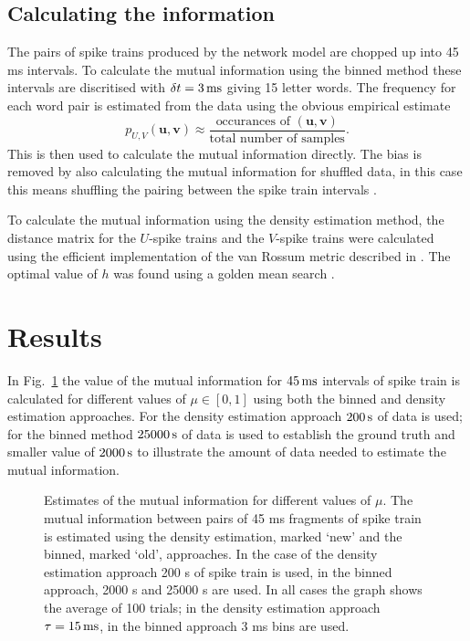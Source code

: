 \documentclass[12pt]{article}
\newcommand{\ms}{\mbox{\,ms}}
\newcommand{\s}{\mbox{\,s}}
\renewcommand{\u}{\mathbf{u}}
\renewcommand{\v}{\mathbf{v}}
\begin{document}
\subsection{Calculating the information}

The pairs of spike trains produced by the network model are chopped up
into 45 ms intervals. To calculate the mutual information using the
binned method these intervals are discritised with $\delta
t=3\ms$ giving 15 letter words. The frequency for each word pair is
estimated from the data using the obvious empirical estimate
\begin{equation}
p_{U,V}(\u,\v)\approx \frac{\mbox{occurances of }(\u,\v)}{\mbox{total number of samples}}.
\end{equation}
This is then used to calculate the mutual information directly. The
bias is removed by also calculating the mutual information for
shuffled data, in this case this means shuffling the pairing between
the spike train intervals \citep{NirenbergEtAl2001,MontemurroEtAl2007,
  PanzeriEtAl2007,MagriEtAl2009}.

To calculate the mutual information using the density estimation
method, the distance matrix for the $U$-spike trains and the $V$-spike
trains were calculated using the efficient implementation of the van
Rossum metric described in \citep{HoughtonKreuz2012}. The optimal
value of $h$ was found using a golden mean search \citep{Kiefer1953}.

\section{Results}

In Fig.~\ref{fig_mu_sweep} the value of the mutual information for
$45\ms$ intervals of spike train is calculated for different values of
$\mu\in[0,1]$ using both the binned and density estimation approaches. For the density estimation
  approach $200\s$ of data is used; for the binned method
  $25000\s$ of data is used to establish the ground truth and smaller
  value of $2000\s$ to illustrate the amount of data needed to
  estimate the mutual information.

\begin{figure}[tp]

\begin{center}

\end{center}
\caption{Estimates of the mutual information for different values of
  $\mu$. The mutual information between pairs of 45 ms fragments of
  spike train is estimated using the density estimation, marked
  \lq{}new\rq{} and the binned, marked \lq{}old\rq{}, approaches. In
  the case of the density estimation approach 200 s of spike train is used, in the
  binned approach, 2000 s and 25000 s are used. In all cases the graph
  shows the average of 100 trials; in the density estimation approach $\tau=15\ms$,
  in the binned approach 3 ms bins are used.\label{fig_mu_sweep}}
\end{figure}
\end{document}
